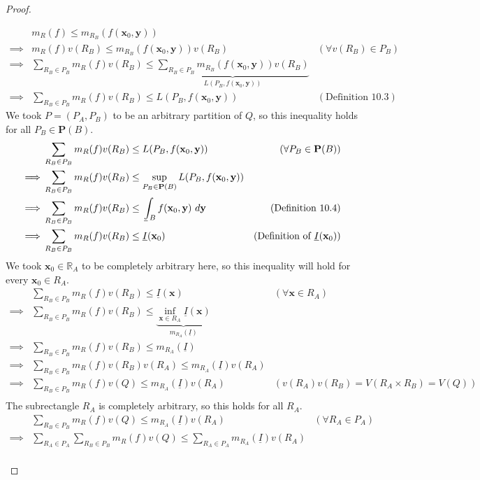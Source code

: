 \documentclass{article}
\def\lowint{\mkern3mu\underline{\vphantom{\intop}\mkern7mu}\mkern-10mu\int}
\newcommand{\R}{\mathbb{R}}
\newcommand{\x}{\mathbf{x}}
\newcommand{\y}{\mathbf{y}}
\theoremstyle{definition}
\begin{document}
\begin{proof}
\begin{enumerate}
 		\begin{align*}
 			&m_{R}(f) \le m_{R_B}( f(\x_0, \y))\\
 			\implies & m_{R}(f)v(R_B) \le m_{R_B}( f(\x_0, \y))v(R_B) & (\forall v(R_B)\in P_B)\\ 
 			\implies &  \sum_{R_B\in P_B}m_{R}(f)v(R_B) \le \underbrace{\sum_{R_B\in P_B}m_{R_B}( f(\x_0, \y))v(R_B)}_{L(P_B, f(\x_0, \y))} \\
 			\implies & \sum_{R_B\in P_B}m_{R}(f)v(R_B) \le L(P_B, f(\x_0, \y))& (\text{Definition 10.3})
 		\end{align*}
 		We took $ P=(P_A, P_B) $ to be an arbitrary partition of $ Q $, so this inequality holds for all $ P_B \in \mathbf P(B)$.
 		\begin{align*}
 			& \sum_{R_B\in P_B}m_{R}(f)v(R_B) \le L(P_B, f(\x_0, \y)) & (\forall P_B \in  \mathbf P(B) )\\ 
 			\implies & \sum_{R_B\in P_B}m_{R}(f)v(R_B) \le \sup_{P_B \in \mathbf P(B)} L(P_B, f(\x_0, \y)) \\
 			\implies & \sum_{R_B\in P_B}m_{R}(f)v(R_B)  \le \lowint_Bf(\x_0,\y)\ d\y & (\text{Definition }10.4)\\ 
 			\implies & \sum_{R_B\in P_B}m_{R}(f)v(R_B) \le \underline{I}(\x_0) & (\text{Definition of } \underline{I}(\x_0) ) 
 		\end{align*} 
 		We took $ \x_0\in \R_A $ to be completely arbitrary here, so this inequality will hold for every $ \x_0 \in R_A $.
 		\begin{align*}
 			&\sum_{R_B\in P_B}m_{R}(f)v(R_B) \le \underline{I}(\x) & (\forall \x \in R_A ) \\
 			\implies & \sum_{R_B\in P_B}m_{R}(f)v(R_B) \le\underbrace{ \inf_{\x\in R_A}\underline{I}(\x) }_{m_{R_A}(\underline{I})}\\
 			\implies & \sum_{R_B\in P_B}m_{R}(f)v(R_B) \le m_{R_A}(\underline{I}) \\ 
 			\implies & \sum_{R_B\in P_B}m_{R}(f)v(R_B)v(R_A) \le m_{R_A}(\underline{I})v(R_A)\\ 
 			\implies & \sum_{R_B\in P_B}m_{R}(f)v(Q) \le m_{R_A}(\underline{I})v(R_A) & (v(R_A)v(R_B) = V(R_A\times R_B)= V(Q))\\ 
 		\end{align*}
 		The subrectangle $ R_A $ is completely arbitrary, so this holds for all $ R_A $. 
 		\begin{align*}
 			&\sum_{R_B\in P_B}m_{R}(f)v(Q) \le m_{R_A}(\underline{I})v(R_A) & (\forall R_A \in P_A) \\
 			\implies & \sum_{R_A\in P_A}\sum_{R_B\in P_B}m_{R}(f)v(Q) \le \sum_{R_A\in P_A}m_{R_A}(\underline{I})v(R_A)\\ 

\end{align*}
\end{enumerate}
\end{proof}
\end{document}
